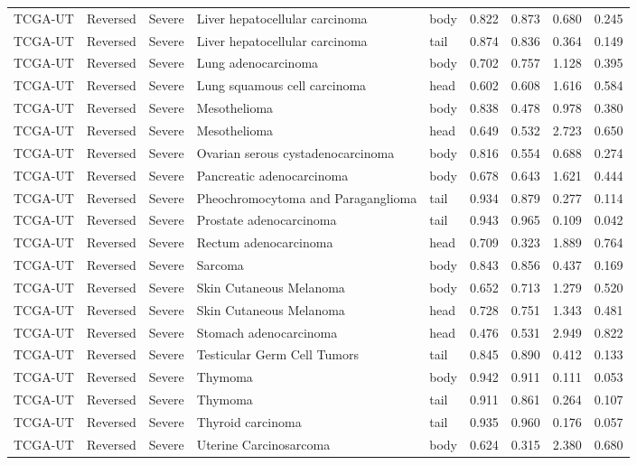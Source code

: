 \begin{longtable}{lllllrrrr}
TCGA-UT & Reversed & Severe & Liver hepatocellular carcinoma & body & 0.822 & 0.873 & 0.680 & 0.245 \\
TCGA-UT & Reversed & Severe & Liver hepatocellular carcinoma & tail & 0.874 & 0.836 & 0.364 & 0.149 \\
TCGA-UT & Reversed & Severe & Lung adenocarcinoma & body & 0.702 & 0.757 & 1.128 & 0.395 \\
TCGA-UT & Reversed & Severe & Lung squamous cell carcinoma & head & 0.602 & 0.608 & 1.616 & 0.584 \\
TCGA-UT & Reversed & Severe & Mesothelioma & body & 0.838 & 0.478 & 0.978 & 0.380 \\
TCGA-UT & Reversed & Severe & Mesothelioma & head & 0.649 & 0.532 & 2.723 & 0.650 \\
TCGA-UT & Reversed & Severe & Ovarian serous cystadenocarcinoma & body & 0.816 & 0.554 & 0.688 & 0.274 \\
TCGA-UT & Reversed & Severe & Pancreatic adenocarcinoma & body & 0.678 & 0.643 & 1.621 & 0.444 \\
TCGA-UT & Reversed & Severe & Pheochromocytoma and Paraganglioma & tail & 0.934 & 0.879 & 0.277 & 0.114 \\
TCGA-UT & Reversed & Severe & Prostate adenocarcinoma & tail & 0.943 & 0.965 & 0.109 & 0.042 \\
TCGA-UT & Reversed & Severe & Rectum adenocarcinoma & head & 0.709 & 0.323 & 1.889 & 0.764 \\
TCGA-UT & Reversed & Severe & Sarcoma & body & 0.843 & 0.856 & 0.437 & 0.169 \\
TCGA-UT & Reversed & Severe & Skin Cutaneous Melanoma & body & 0.652 & 0.713 & 1.279 & 0.520 \\
TCGA-UT & Reversed & Severe & Skin Cutaneous Melanoma & head & 0.728 & 0.751 & 1.343 & 0.481 \\
TCGA-UT & Reversed & Severe & Stomach adenocarcinoma & head & 0.476 & 0.531 & 2.949 & 0.822 \\
TCGA-UT & Reversed & Severe & Testicular Germ Cell Tumors & tail & 0.845 & 0.890 & 0.412 & 0.133 \\
TCGA-UT & Reversed & Severe & Thymoma & body & 0.942 & 0.911 & 0.111 & 0.053 \\
TCGA-UT & Reversed & Severe & Thymoma & tail & 0.911 & 0.861 & 0.264 & 0.107 \\
TCGA-UT & Reversed & Severe & Thyroid carcinoma & tail & 0.935 & 0.960 & 0.176 & 0.057 \\
TCGA-UT & Reversed & Severe & Uterine Carcinosarcoma & body & 0.624 & 0.315 & 2.380 & 0.680 \\

\end{longtable}
